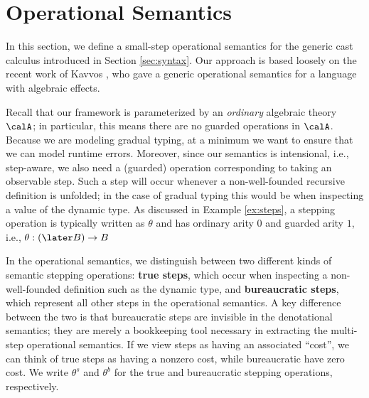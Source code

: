\documentclass[acmsmall,screen,review,anonymous]{acmart}
\theoremstyle{remark}
\begin{document}
\section{Operational Semantics}\label{sec:operational-semantics}

In this section, we define a small-step operational semantics for the generic
cast calculus introduced in Section \ref{sec:syntax}. Our approach is based
loosely on the recent work of Kavvos \cite{kavvos-2025}, who gave a generic
operational semantics for a language with algebraic effects.

Recall that our framework is parameterized by an \emph{ordinary} algebraic
theory $\calA$; in particular, this means there are no guarded operations in
$\calA$.
%
Because we are modeling gradual typing, at a minimum we want to ensure that we
can model runtime errors. Moreover, since our semantics is intensional, i.e.,
step-aware, we also need a (guarded) operation corresponding to taking an observable
step. Such a step will occur whenever a non-well-founded recursive definition is
unfolded; in the case of gradual typing this would be when inspecting a value of
the dynamic type.
%
As discussed in Example \ref{ex:steps}, a stepping operation is typically
written as $\theta$ and has ordinary arity $0$ and guarded arity $1$, i.e.,
$\theta : (\later B) \to B$


In the operational semantics, we distinguish between two different kinds of
semantic stepping operations: \textbf{true steps}, which occur when inspecting a
non-well-founded definition such as the dynamic type, and \textbf{bureaucratic
steps}, which represent all other steps in the operational semantics. A key
difference between the two is that bureaucratic steps are invisible in the
denotational semantics; they are merely a bookkeeping tool necessary in
extracting the multi-step operational semantics.
%
If we view steps as having an associated ``cost'', we can think of true steps as
having a nonzero cost, while bureaucratic have zero cost. We write $\theta^s$
and $\theta^b$ for the true and bureaucratic stepping operations, respectively.
%
\end{document}
